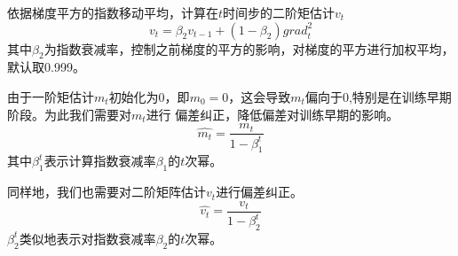 \noindent{}依据梯度平方的指数移动平均，计算在$t$时间步的二阶矩估计$v_{t}$
\begin{equation}
    v_{t} = \beta_{2} v_{t-1} + (1 - \beta_{2}) {grad}_{t}^{2}
\end{equation}
其中$\beta_{2}$为指数衰减率，控制之前梯度的平方的影响，对梯度的平方进行加权平均，默认取0.999。

\noindent{}由于一阶矩估计$m_{t}$初始化为0，即$m_{0} = 0$，这会导致$m_{t}$偏向于0,特别是在训练早期阶段。为此我们需要对$m_{t}$进行
偏差纠正，降低偏差对训练早期的影响。
\begin{equation}
    \widehat{m_t} = \frac{m_t}{1 - \beta_{1}^{t}}
\end{equation}
其中$\beta_{1}^{t}$表示计算指数衰减率$\beta_{1}$的$t$次幂。

\noindent{}同样地，我们也需要对二阶矩阵估计$v_{t}$进行偏差纠正。
\begin{equation}
    \widehat{v_t} = \frac{v_t}{1 - \beta_{2}^{t}}
\end{equation}
$\beta_{2}^{t}$类似地表示对指数衰减率$\beta_{2}$的$t$次幂。

